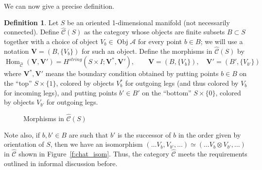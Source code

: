 \documentclass{amsart}
\theoremstyle{definition}
\newtheorem{definition}[theorem]{Definition}
\theoremstyle{remark}
\numberwithin{equation}{section}
\newcommand{\firef}[1]{Figure~{\rm\ref{#1}}}
\newcommand{\<}{\langle}
\renewcommand{\>}{\rangle}
\newcommand{\Chat}{\widehat{\mathcal{C}}}      %
\newcommand{\A}{\mathcal{A}}      %
\newcommand{\VV}{\mathbf{V}}       %
\newcommand{\ph}{\varphi}
\newcommand{\Hs}{H^{string}}
\DeclareMathOperator{\Hom}{Hom}
\DeclareMathOperator{\Obj}{Obj}
\begin{document}
We can now give a precise definition. 
\begin{definition}\label{d:Chat}
  Let $S$ be an oriented 1-dimensional manifold (not necessarily  
  connected). Define  $\Chat(S)$ as the category whose objects are finite 
  subsets  $B\subset S$ together with a choice of object $V_b\in \Obj \A$ for 
  every point $b\in B$; we will use a notation $\VV=(B, \{V_b\})$ for 
  such an object. Define the  morphisms in $\Chat(S)$ by  
  $$
  \Hom_{\Chat}(\VV, \VV')=\Hs(S\times I; \VV^*,\VV'),\qquad
  \VV=(B,\{V_b\}), \quad 
  \VV'=(B',\{V_{b'}\})
 $$ 
 where $\VV^*, \VV'$ means the boundary condition obtained by putting
points $b\in B$ on the ``top'' $S\times\{1\}$, colored by objects
$V_b^*$ for outgoing legs (and thus colored by $V_b$ for incoming legs),
and putting points $b'\in B'$ on the ``bottom'' $S\times\{0\}$, colored by
objects $V_{b'}$ for outgoing legs.

\begin{figure}[ht]
  \caption{Morphisms in $\Chat(S)$}
  \label{f:morphisms_Chat}
\end{figure}

\end{definition}


Note also, if $b, b'\in B$ are such that $b'$ is the successor  of 
$b$ in the order given by orientation of $S$, then we have an isomorphism
$( \dots V_b, V_{b'}, 
\dots) \simeq (\dots V_b\otimes V_{b'}, \dots)$ in  $\Chat$ shown in
\firef{f:chat_isom}. Thus,  the category $\Chat$ meets the requirements
outlined in informal discussion before. 
\end{document}
